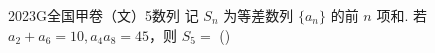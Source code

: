 
\begin{problem}{2023}{G}{全国甲卷（文）}{5}{数列}
记 $S_n$ 为等差数列 $\{a_n\}$ 的前 $n$ 项和. 若 $a_2+a_6=10, a_4 a_8=45$，则 $S_5=$
(\hspace{1cm})
\begin{choices}
\end{choices}
\end{problem}
